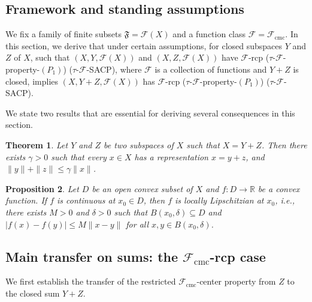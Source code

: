 \documentclass[11pt]{amsart}
\newtheorem{thm}{Theorem}[section]
\newtheorem{prop}[thm]{Proposition}
\newcommand{\ra}{\rightarrow}
\newcommand{\ci}{\subseteq}
\newcommand{\de}{\delta}
\newcommand{\ga}{\gamma}
\newcommand{\mb}{\mathbb}
\newcommand{\mc}{\mathcal}
\newcommand{\mf}{\mathfrak}
\newcommand{\mr}{\mathscr}
\begin{document}
\subsection{Framework and standing assumptions}\label{subsec:framework}
We fix a family of finite subsets $\mf F=\mc F(X)$ and a function class
$\mr F =\mr F_{\mathrm{cmc}}$.
In this section, we derive that under certain assumptions, for closed subspaces $Y$ and $Z$ of $X$, such that $(X,Y,\mc{F}(X))$ and $(X,Z,\mc{F}(X))$ have $\mr{F}$-rcp ($\tau$-$\mr{F}$-property-$(P_1)$) ($\tau$-$\mr{F}$-SACP), where $\mr{F}$ is a collection of functions and $Y+Z$ is closed, implies $(X,Y+Z,\mc{F}(X))$ has $\mr{F}$-rcp ($\tau$-$\mr{F}$-property-$(P_1)$) ($\tau$-$\mr{F}$-SACP).

We state two results that are essential for deriving several consequences in this section.
\begin{thm}\cite[Theorem~6.20]{WR}\label{T8}
Let $Y$ and $Z$ be two subspaces of $X$ such that $X=Y+Z$. Then there exists $\ga>0$ such that every $x\in X$  has a representation $x=y+z$, and $\|y\|+\|z\|\leq\ga\|x\|$.
\end{thm}
\begin{prop}\cite[Proposition~1.6]{RRP}\label{T9}
Let $D$ be an open convex subset of $X$ and $f:D\ra\mb{R}$ be a convex function. If $f$ is continuous at $x_0\in D$, then $f$ is locally Lipschitzian at $x_0$, i.e., there exists $M>0$ and $\de>0$ such that $B(x_0,\de)\ci D$ and $|f(x)-f(y)|\leq M\|x-y\|$ for all $x,y\in B(x_0,\de)$.
\end{prop}

\subsection{Main transfer on sums: the $\mr F_{\mathrm{cmc}}$-rcp case}
We first establish the transfer of the restricted $\mr F_{\mathrm{cmc}}$-center property from $Z$ to the closed sum $Y+Z$.
\end{document}
